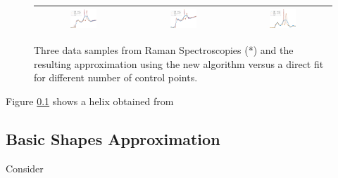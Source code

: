  
 
 
 \begin{figure}
  \begin{tabular}{ccc}
  \hline
{\includegraphics[width=0.29\textwidth]{noise1}}
&{\includegraphics[width=0.29\textwidth]{noise2}}
&{\includegraphics[width=0.29\textwidth]{noise3}}\\
\hline
  \end{tabular}
\caption{\label{fig:noise_DLS_vs_ECILS} Three data samples from Raman Spectroscopies (*) 
and the resulting approximation using the new algorithm versus a direct fit for different number of control points. 
}
 \end{figure}



 
 Figure \ref{} shows a helix obtained from \subsection{Basic Shapes Approximation}
 Consider
 
 



   
